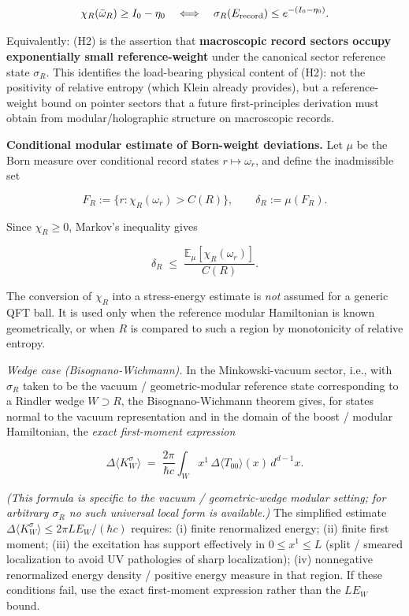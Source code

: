 \documentclass[11pt,a4paper]{article}
\begin{document}
\[
\chi_R(\bar\omega_R) \ge I_0 - \eta_0 \quad \Longleftrightarrow \quad \sigma_R(E_{\rm record}) \le e^{-(I_0 - \eta_0)}.
\]

Equivalently: (H2) is the assertion that \textbf{macroscopic record sectors occupy exponentially small reference-weight} under the canonical sector reference state $\sigma_R$. This identifies the load-bearing physical content of (H2): not the positivity of relative entropy (which Klein already provides), but a reference-weight bound on pointer sectors that a future first-principles derivation must obtain from modular/holographic structure on macroscopic records.

\textbf{Conditional modular estimate of Born-weight deviations.} Let $\mu$ be the Born measure over conditional record states $r \mapsto \omega_r$, and define the inadmissible set

\[
F_R := \{r : \chi_R(\omega_r) > C(R)\}, \qquad \delta_R := \mu(F_R).
\]

Since $\chi_R \ge 0$, Markov's inequality gives

\[
\delta_R \;\le\; \frac{\mathbb{E}_\mu[\chi_R(\omega_r)]}{C(R)}.
\]

The conversion of $\chi_R$ into a stress-energy estimate is \emph{not} assumed for a generic QFT ball. It is used only when the reference modular Hamiltonian is known geometrically, or when $R$ is compared to such a region by monotonicity of relative entropy.

\emph{Wedge case (Bisognano-Wichmann).} In the Minkowski-vacuum sector, i.e., with $\sigma_R$ taken to be the vacuum / geometric-modular reference state corresponding to a Rindler wedge $W \supset R$, the Bisognano-Wichmann theorem gives, for states normal to the vacuum representation and in the domain of the boost / modular Hamiltonian, the \emph{exact first-moment expression}

\[
\Delta\langle K_W^\sigma\rangle \;=\; \frac{2\pi}{\hbar c} \int_W x^1 \, \Delta\langle T_{00}\rangle(x) \, d^{d-1}x.
\]

\emph{(This formula is specific to the vacuum / geometric-wedge modular setting; for arbitrary $\sigma_R$ no such universal local form is available.)}
The simplified estimate $\Delta\langle K_W^\sigma\rangle \le 2\pi L E_W/(\hbar c)$ requires: (i) finite renormalized energy; (ii) finite first moment; (iii) the excitation has support effectively in $0 \le x^1 \le L$ (split / smeared localization to avoid UV pathologies of sharp localization); (iv) nonnegative renormalized energy density / positive energy measure in that region. If these conditions fail, use the exact first-moment expression rather than the $L E_W$ bound.
\end{document}
